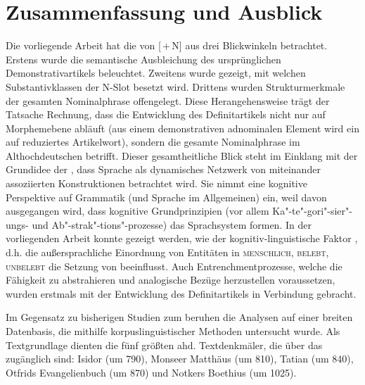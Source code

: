 \chapter{Zusammenfassung und Ausblick}\label{kapitel:zusammenfassung}

Die vorliegende Arbeit hat die  von [\,+\,N] aus drei Blickwinkeln betrachtet. Erstens wurde die semantische Ausbleichung des ursprünglichen Demonstrativartikels  beleuchtet. Zweitens wurde gezeigt, mit welchen Substantivklassen  der N-Slot besetzt wird. Drittens wurden Strukturmerkmale  der gesamten Nominalphrase  offengelegt. 
Diese Herangehensweise trägt der Tatsache Rechnung, dass die Entwicklung des Definitartikels  nicht nur auf Morphemebene  abläuft (aus einem demonstrativen adnominalen Element wird ein auf  reduziertes Artikelwort), sondern die gesamte Nominalphrase  im Althochdeutschen betrifft. Dieser gesamtheitliche Blick steht im Einklang mit der Grundidee der , dass Sprache als dynamisches Netzwerk von miteinander assoziierten Konstruktionen  betrachtet wird. Sie nimmt eine kognitive Perspektive auf Grammatik (und Sprache im Allgemeinen) ein, weil davon ausgegangen wird, dass kognitive Grundprinzipien (vor allem Ka"-te"-gori"-sier"-ungs- und Ab"-strak"-tions"-prozesse) das Sprachsystem formen. In der vorliegenden Arbeit konnte gezeigt werden, wie der kognitiv-linguistische Faktor , d.h. die außersprachliche Einordnung von Entitäten in \textsc{menschlich, belebt, unbelebt} die Setzung von  beeinflusst. Auch  Entrenchmentprozesse, welche die Fähigkeit zu abstrahieren und analogische  Bezüge herzustellen voraussetzen, wurden erstmals mit der Entwicklung des Definitartikels  in Verbindung gebracht.

Im Gegensatz zu bisherigen Studien zum  beruhen die Analysen auf einer breiten Datenbasis, die mithilfe korpuslinguistischer Methoden  untersucht wurde. Als Textgrundlage  dienten die fünf größten ahd. Textdenkmäler, die über das  zugänglich sind: Isidor (um 790), Monseer Matthäus (um 810), Tatian (um 840), Otfrids Evangelienbuch (um 870) und Notkers Boethius (um 1025). 

